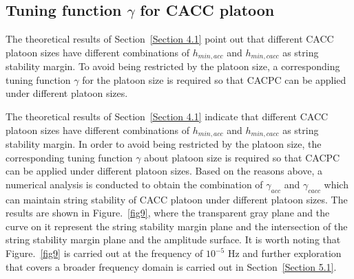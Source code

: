\documentclass[journal]{IEEEtran}
\begin{document}
\subsection{Tuning function $\gamma$ for CACC platoon}
\label{Section 4.3}

The theoretical results of Section~\ref{Section 4.1} point out that different CACC platoon sizes have different combinations of $h_{min,acc}$ and $h_{min,cacc}$ as string stability margin. To avoid being restricted by the platoon size, a corresponding tuning function $\gamma$ for the platoon size is required so that CACPC can be applied under different platoon sizes.

The theoretical results of Section~\ref{Section 4.1} indicate that different CACC platoon sizes have different combinations of $h_{min,acc}$ and $h_{min,cacc}$ as string stability margin. In order to avoid being restricted by the platoon size, the corresponding tuning function $\gamma$ about platoon size is required so that CACPC can be applied under different platoon sizes. Based on the reasons above, a numerical analysis is conducted to obtain the combination of $\gamma_{acc}$ and $\gamma_{cacc}$ which can maintain string stability of CACC platoon under different platoon sizes. The results are shown in Figure.~\ref{fig9}, where the transparent gray plane and the curve on it represent the string stability margin plane and the intersection of the string stability margin plane and the amplitude surface. It is worth noting that Figure.~\ref{fig9} is carried out at the frequency of $10^{-5}$ Hz and further exploration that covers a broader frequency domain is carried out in Section~\ref{Section 5.1}.
\end{document}
